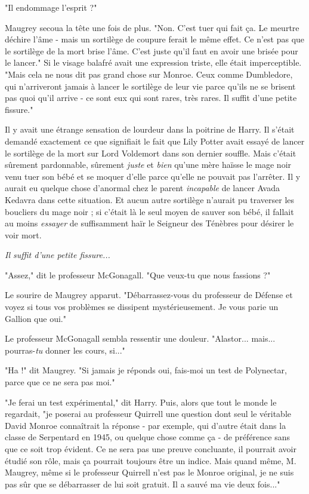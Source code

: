 "Il endommage l'esprit ?"

Maugrey secoua la tête une fois de plus. "Non. C'est tuer qui fait ça. Le meurtre déchire l'âme - mais un sortilège de coupure ferait le même effet. Ce n'est pas que le sortilège de la mort brise l'âme. C'est juste qu'il faut en avoir une brisée pour le lancer." Si le visage balafré avait une expression triste, elle était imperceptible. "Mais cela ne nous dit pas grand chose sur Monroe. Ceux comme Dumbledore, qui n'arriveront jamais à lancer le sortilège de leur vie parce qu'ils ne se brisent pas quoi qu'il arrive - ce sont eux qui sont rares, très rares. Il suffit d'une petite fissure."

Il y avait une étrange sensation de lourdeur dans la poitrine de Harry. Il s'était demandé exactement ce que signifiait le fait que Lily Potter avait essayé de lancer le sortilège de la mort sur Lord Voldemort dans son dernier souffle. Mais c'était sûrement pardonnable, sûrement \emph{juste } et \emph{bien } qu'une mère haïsse le mage noir venu tuer son bébé et se moquer d'elle parce qu'elle ne pouvait pas l'arrêter. Il y aurait eu quelque chose d'anormal chez le parent \emph{incapable } de lancer Avada Kedavra dans cette situation. Et aucun autre sortilège n'aurait pu traverser les boucliers du mage noir ; si c'était là le seul moyen de sauver son bébé, il fallait au moins \emph{essayer}  de suffisamment haïr le Seigneur des Ténèbres pour désirer le voir mort.

\emph{Il suffit d'une petite fissure...} 

"Assez," dit le professeur McGonagall. "Que veux-tu que nous fassions ?"

Le sourire de Maugrey apparut. "Débarrassez-vous du professeur de Défense et voyez si tous vos problèmes se dissipent mystérieusement. Je vous parie un Gallion que oui."

Le professeur McGonagall sembla ressentir une douleur. "Alastor... mais... pourras-\emph{tu}  donner les cours, si..."

"Ha !" dit Maugrey. "Si jamais je réponds oui, fais-moi un test de Polynectar, parce que ce ne sera pas moi."

"Je ferai un test expérimental," dit Harry. Puis, alors que tout le monde le regardait, "je poserai au professeur Quirrell une question dont seul le véritable David Monroe connaîtrait la réponse - par exemple, qui d'autre était dans la classe de Serpentard en 1945, ou quelque chose comme ça - de préférence sans que ce soit trop évident. Ce ne sera pas une preuve concluante, il pourrait avoir étudié son rôle, mais ça pourrait toujours être un indice. Mais quand même, M. Maugrey, même si le professeur Quirrell n'est pas le Monroe original, je ne suis pas sûr que se débarrasser de lui soit gratuit. Il a sauvé ma vie deux fois..."

